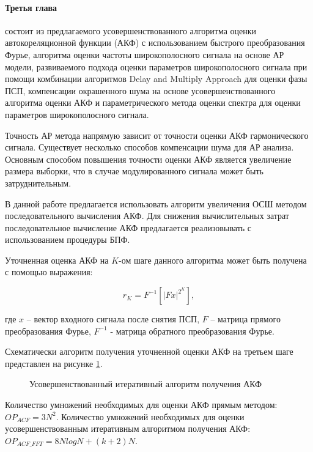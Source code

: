 \paragraph{Третья глава} состоит из предлагаемого усовершенствованного алгоритма оценки автокореляционной функции (АКФ) с использованием
быстрого преобразования Фурье, алгоритма оценки частоты широкополосного сигнала на основе АР модели,
развиваемого подхода оценки параметров широкополосного сигнала 
при помощи комбинации алгоритмов Delay and Multiply Approach для оценки фазы ПСП, компенсации 
окрашенного шума на основе усовершенствованного алгоритма оценки АКФ и параметрического метода оценки спектра
для оценки параметров широкополосного сигнала.

Точность АР метода напрямую зависит от точности оценки АКФ гармонического сигнала.
Существует несколько способов компенсации шума для АР анализа.
Основным способом повышения точности оценки АКФ является увеличение размера выборки, что в случае модулированного сигнала может быть затруднительным. 

В данной работе предлагается использовать алгоритм увеличения ОСШ методом последовательного вычисления АКФ.
Для снижения вычислительных затрат последовательное вычисление АКФ предлагается реализовывать с использованием процедуры БПФ. 

Уточненная оценка АКФ на ${K}$-ом шаге данного алгоритма может быть получена с помощью выражения:
\begin{center}
\begin{equation}
	\label{eq:akf_3}
	\hat{r}_K = F^{-1}\left[ \left| Fx \right| ^{2^K} \right],
\end{equation}
\end{center}
где ${x}$ – вектор входного сигнала после снятия ПСП, ${F}$ – матрица прямого преобразования Фурье,
${F^{-1}}$ - матрица обратного преобразования Фурье.

Схематически алгоритм получения уточненной оценки АКФ на третьем шаге представлен на рисунке \ref{pic:akf_pic}.
\begin{figure}[H]
	\center{}
	\caption{Усовершенствованный итеративный алгоритм получения АКФ}
	\label{pic:akf_pic}
\end{figure}

Количество умножений необходимых для оценки АКФ прямым методом: ${OP_{ACF} = 3N^2}$. Количество умножений необходимых для оценки
усовершенствованным итеративным алгоритмом получения АКФ: ${OP_{ACF\_FFT} = 8NlogN + (k+2)N}$.

